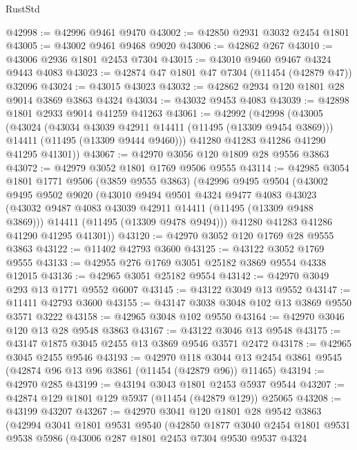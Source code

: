 \begin{lexlean}{RustStd}
\begin{coremodule}
@42998 := @42996 @9461 @9470
@43002 := @42850 @2931 @3032 @2454 @1801
@43005 := @43002 @9461 @9468 @9020
@43006 := @42862 @267
@43010 := @43006 @2936 @1801 @2453 @7304
@43015 := @43010 @9460 @9467 @4324 @9443 @4083
@43023 := @42874 @47 @1801 @47 @7304 (@11454 (@42879 @47)) @32096
@43024 := @43015 @43023
@43032 := @42862 @2934 @120 @1801 @28 @9014 @3869 @3863 @4324
@43034 := @43032 @9453 @4083
@43039 := @42898 @1801 @2933 @9014 @41259 @41263
@43061 := @42992
    (@42998
      (@43005
        (@43024
          (@43034 @43039 @42911 @14411 (@11495 (@13309 @9454 @3869)))
          @14411
          (@11495 (@13309 @9444 @9460)))
        @41280
        @41283
        @41286
        @41290
        @41295
        @41301))
@43067 := @42970 @3056 @120 @1809 @28 @9556 @3863
@43072 := @42979 @3052 @1801 @1769 @9506 @9555
@43114 := @42985
    @3054
    @1801
    @1771
    @9506
    (@3859 @9555 @3863)
    (@42996
      @9495
      @9504
      (@43002
        @9495
        @9502
        @9020
        (@43010
          @9494
          @9501
          @4324
          @9477
          @4083
          @43023
          (@43032 @9487 @4083 @43039 @42911 @14411 (@11495 (@13309 @9488 @3869)))
          @14411
          (@11495 (@13309 @9478 @9494)))
        @41280
        @41283
        @41286
        @41290
        @41295
        @41301))
@43120 := @42970 @3052 @120 @1769 @28 @9555 @3863
@43122 := @11402 @42793 @3600
@43125 := @43122 @3052 @1769 @9555
@43133 := @42955 @276 @1769 @3051 @25182 @3869 @9554 @4338 @12015
@43136 := @42965 @3051 @25182 @9554
@43142 := @42970 @3049 @293 @13 @1771 @9552 @6007
@43145 := @43122 @3049 @13 @9552
@43147 := @11411 @42793 @3600
@43155 := @43147 @3038 @3048 @102 @13 @3869 @9550 @3571 @3222
@43158 := @42965 @3048 @102 @9550
@43164 := @42970 @3046 @120 @13 @28 @9548 @3863
@43167 := @43122 @3046 @13 @9548
@43175 := @43147 @1875 @3045 @2455 @13 @3869 @9546 @3571 @2472
@43178 := @42965 @3045 @2455 @9546
@43193 := @42970
    @118
    @3044
    @13
    @2454
    @3861
    @9545
    (@42874 @96 @13 @96 @3861 (@11454 (@42879 @96)) @11465)
@43194 := @42970 @285
@43199 := @43194 @3043 @1801 @2453 @5937 @9544
@43207 := @42874 @129 @1801 @129 @5937 (@11454 (@42879 @129)) @25065
@43208 := @43199 @43207
@43267 := @42970
    @3041
    @120
    @1801
    @28
    @9542
    @3863
    (@42994
      @3041
      @1801
      @9531
      @9540
      (@42850
        @1877
        @3040
        @2454
        @1801
        @9531
        @9538
        @5986
        (@43006
          @287
          @1801
          @2453
          @7304
          @9530
          @9537
          @4324

\end{coremodule}
\end{lexlean}
